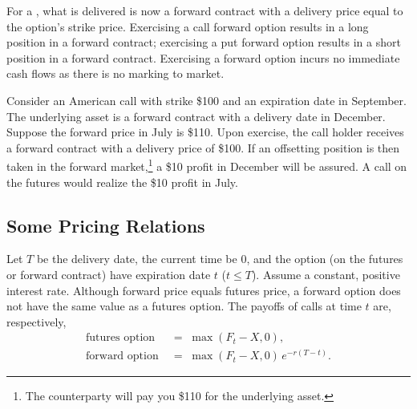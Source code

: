 
For a , what is delivered is now a forward contract with a delivery price equal to the option's strike price.
Exercising a call forward option results in a long position in a forward contract; exercising a put forward option results in a short position in a forward contract.
Exercising a forward option incurs no immediate cash flows as there is no marking to market.

\suppstart
{}
\suppend

\begin{eg}
	Consider an American call with strike \$100 and an expiration date in September.
	The underlying asset is a forward contract with a delivery date in December.
	Suppose the forward price in July is \$110.
	Upon exercise, the call holder receives a forward contract with a delivery price of \$100.
	If an offsetting position is then taken in the forward market,\footnote{The counterparty will pay you \$110 for the underlying asset.} a \$10 profit in December will be assured.
	A call on the futures would realize the \$10 profit in July.
\end{eg}

\suppstart
{}
\suppend

\subsection{Some Pricing Relations}


Let $T$ be the delivery date, the current time be $0$, and the option (on the futures or forward contract) have expiration date $t$ ($t\le T$).
Assume a constant, positive interest rate.
Although forward price equals futures price, a forward option does not have the same value as a futures option.
The payoffs of calls at time $t$ are, respectively,
\begin{align}
	\text{futures option} & \;=\; \max(F_{t}-X,0) , \label{eq:futures-option-payoff} \\
	\text{forward option} & \;=\; \max(F_{t}-X,0)\,e^{-r(T-t)} . \label{eq:forward-option-payoff}
\end{align}

